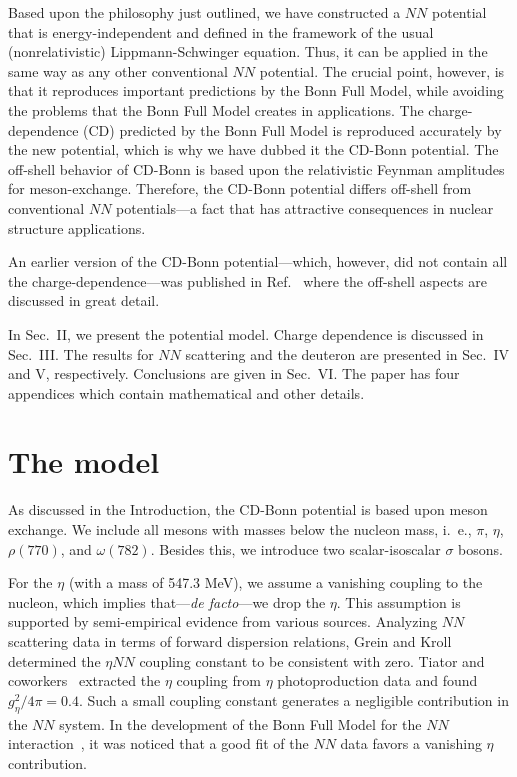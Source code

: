 Based upon the philosophy just outlined,
we have constructed a $NN$ potential
that is energy-independent and defined in the framework
of the usual (nonrelativistic) Lippmann-Schwinger equation.
Thus, it can be applied in the same way as any other conventional $NN$
potential. The crucial point, however, is that it
reproduces important predictions by the Bonn Full Model, 
while avoiding the problems that the Bonn Full Model creates in
applications.
The charge-dependence (CD) predicted by the Bonn Full Model
is reproduced accurately by the new potential, which is why
we have dubbed it the CD-Bonn potential.
The off-shell behavior of CD-Bonn is based 
upon the relativistic Feynman amplitudes for meson-exchange.
Therefore, the CD-Bonn potential differs off-shell
from conventional $NN$ potentials---a fact that has
attractive consequences in nuclear structure applications.

An earlier version of the CD-Bonn potential---which, however, did
not contain all the charge-dependence---was published in 
Ref.~\cite{MSS96} where the off-shell aspects are discussed
in great detail.

In Sec.~II, we present the potential model.
Charge dependence is discussed in Sec.~III.
The results for $NN$ scattering and the deuteron are
presented in Sec.~IV and V, respectively.
Conclusions are given in Sec.~VI.
The paper has four appendices which contain
mathematical and other details.


\section{The model}

As discussed in the Introduction, the CD-Bonn potential is based upon
meson exchange.
We include all mesons with masses below the nucleon mass, i.~e.,
$\pi$, $\eta$, $\rho(770)$, and $\omega(782)$. Besides this, we introduce
two scalar-isoscalar $\sigma$ bosons.

For the $\eta$ (with a mass of 547.3 MeV), we assume a 
vanishing coupling to the nucleon,
which implies that---{\it de facto}---we drop the $\eta$.
This assumption is supported by semi-empirical evidence
from various sources. Analyzing $NN$ scattering data in terms
of forward dispersion relations, Grein and Kroll~\cite{GK80} determined
the $\eta NN$ coupling constant to be consistent with zero.
Tiator and coworkers~\cite{TBK94} extracted the $\eta$ coupling
from $\eta$ photoproduction data and found $g_\eta^2/4\pi=0.4$.
Such a small coupling constant generates a negligible 
contribution in the $NN$ system.
In the development of the Bonn Full Model 
for the $NN$ interaction~\cite{MHE87},
it was noticed that a good fit of the $NN$ data favors
a vanishing $\eta$ contribution.

